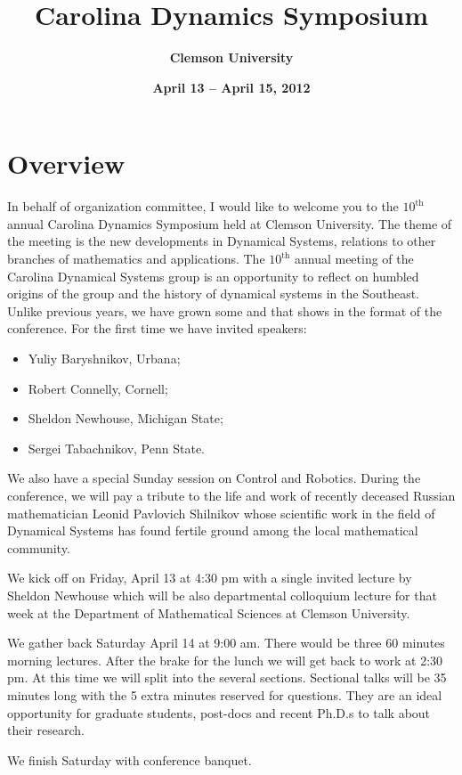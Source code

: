 \documentclass[10pt,foldmark,notumble,draft]{leaflet}
\title{\bf Carolina Dynamics Symposium}
\author{%
\Large \bf Clemson University
}
\date{\bf April 13 -- April 15, 2012 }
\begin{document}
\maketitle
\section{Overview} In behalf of organization committee, I would like
to welcome you to the $10^{\mbox{th}}$ annual Carolina Dynamics
Symposium held at Clemson University. The theme of the meeting is the
new developments in Dynamical Systems, relations to other branches of
mathematics and applications. The $10^{\mbox{th}}$ annual meeting of the
Carolina Dynamical Systems group is an opportunity to reflect on humbled
origins of the group and the history of dynamical systems in the
Southeast. Unlike previous years, we have grown some and that shows in
the format of the conference. For the first time we have invited
speakers:

\begin{itemize}
\item Yuliy Baryshnikov, Urbana;
\item Robert Connelly, Cornell;
\item Sheldon Newhouse, Michigan State;
\item Sergei Tabachnikov, Penn State.
\end{itemize}

We also have a special Sunday session on Control and Robotics. During
the conference, we will pay a tribute to the life and work of recently
deceased Russian mathematician Leonid Pavlovich Shilnikov whose
scientific work in the field of Dynamical Systems has found fertile
ground among the local mathematical community.


We kick off on Friday, April 13 at 4:30 pm with a single invited lecture
by Sheldon Newhouse which will be also departmental colloquium lecture
for that week at the Department of Mathematical Sciences at Clemson
University.


We gather back Saturday April 14 at 9:00 am. There would be three 60
minutes morning lectures. After the brake for the lunch we will get back
to work at 2:30 pm. At this time we will split into the several
sections. Sectional talks will be 35 minutes long with the 5 extra
minutes reserved for questions. They are an ideal opportunity for
graduate students, post-docs and recent Ph.D.s to talk about their
research.


We finish Saturday with conference banquet.
\end{document}
